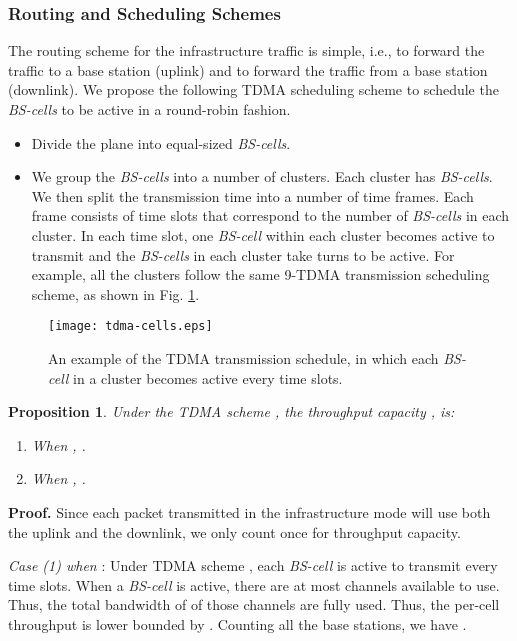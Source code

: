 \documentclass[10pt,journal]{IEEEtran}
\newtheorem{proposition}{Proposition}
\begin{document}
\subsubsection{Routing and Scheduling Schemes}
The routing scheme for the infrastructure traffic is simple, i.e., to forward the traffic to
a base station (uplink) and to forward the traffic from a base station (downlink). We propose the following TDMA scheduling scheme  to schedule the \textit{BS-cells} to be active in a round-robin fashion. 
\begin{itemize}
\item[(1)] Divide the plane into  equal-sized \textit{BS-cells}.
\item[(2)] We group the  \textit{BS-cells} into a number of clusters. Each cluster has  \textit{BS-cells}. We then split the transmission time into a number of time frames. Each frame consists of  time slots that correspond to the number of \textit{BS-cells} in each cluster. In each time slot, one \textit{BS-cell} within each cluster becomes active to transmit and the \textit{BS-cells} in each cluster take turns to be active. For example, all the clusters follow the same 9-TDMA transmission scheduling scheme, as shown in Fig. \ref{fig:tdma-cells}.
\end{itemize}

\begin{figure}[t]
\centering
\texttt{[image: tdma-cells.eps]}
\caption{{An example of the TDMA transmission schedule, in which each \textit{BS-cell} in a cluster becomes active every  time slots.}}
\label{fig:tdma-cells}
\end{figure}


\begin{proposition}
\label{prop:lower_infra}
Under the TDMA scheme , the throughput capacity , is:
\begin{enumerate}
\item[(1)] When , . 
 
\item[(2)] When , .
\end{enumerate}
\end{proposition}
\textbf{Proof.}
Since each packet transmitted in the infrastructure mode will use both the uplink and the downlink,
we only count once for throughput capacity.

\textit{Case (1) when }:
Under TDMA scheme , each \textit{BS-cell} is active to transmit every  time slots. When a \textit{BS-cell} is active, there are at most  channels available to use. Thus, the total bandwidth of  of those  channels are fully used. Thus, the per-cell throughput  is lower bounded by . Counting all the  base stations, we have .
\end{document}
